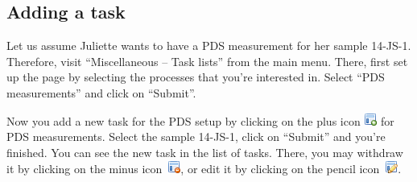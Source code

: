 \documentclass[a4paper,11pt,english]{sphinxmanual}
\begin{document}
\subsection{Adding a task}
\label{demo:adding-a-task}
{\hfill{}}

Let us assume Juliette wants to have a PDS measurement for her sample 14-JS-1.
Therefore, visit “Miscellaneous – Task lists” from the main menu.  There,
first set up the page by selecting the processes that you're interested in.
Select “PDS measurements” and click on “Submit”.

Now you add a new task for the PDS setup by clicking on the plus icon \includegraphics{layout_add.png} for PDS measurements.  Select the sample 14-JS-1, click on “Submit”
and you're finished.  You can see the new task in the list of tasks.  There,
you may withdraw it by clicking on the minus icon \includegraphics{layout_delete.png}, or edit
it by clicking on the pencil icon \includegraphics{layout_edit.png}.
\end{document}

